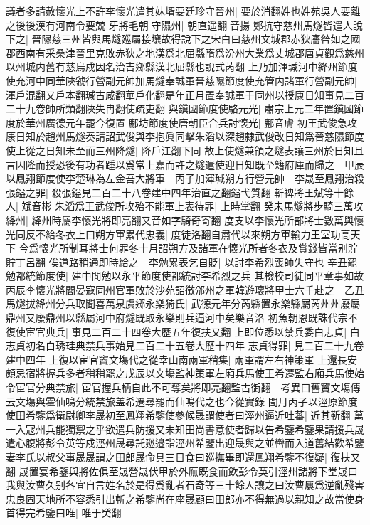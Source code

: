 議者多請赦懷光上不許李懷光遣其妹壻要廷珍守晉州|{
	要於消翻姓也姓苑吳人要離之後後漢有河南令要兢}
牙將毛朝守隰州|{
	朝直遥翻音揚}
鄭抗守慈州馬燧皆遣人說下之|{
	晉隰慈三州皆與馬燧廵屬接壤故得說下之宋白曰慈州文城郡赤狄廧咎如之國郡西南有采桑津晉里克敗赤狄之地漢爲北屈縣隋爲汾州大業爲丈城郡唐貞觀爲慈州以州城内舊冇慈烏戍因名治吉鄉縣漢北屈縣也說式芮翻}
上乃加渾瑊河中絳州節度使充河中同華陜虢行營副元帥加馬燧奉誠軍晉慈隰節度使充管内諸軍行營副元帥|{
	渾戶混翻又戶本翻瑊古咸翻華戶化翻是年正月置奉誠軍于同州以授康日知事見二百二十九卷帥所類翻陜失冉翻使疏吏翻}
與鎭國節度使駱元光|{
	肅宗上元二年置鎭國節度於華州廣德元年罷今復置}
鄜坊節度使唐朝臣合兵討懷光|{
	鄜音膚}
初王武俊急攻康日知於趙州馬燧奏請詔武俊與李抱眞同擊朱滔以深趙隸武俊改日知爲晉慈隰節度使上從之日知未至而三州降燧|{
	降戶江翻下同}
故上使燧兼領之燧表讓三州於日知且言因降而授恐後有功者踵以爲常上嘉而許之燧遣使迎日知既至籍府庫而歸之　甲辰以鳳翔節度使李楚琳為左金吾大將軍　丙子加渾瑊朔方行營元帥　李晟至鳳翔治殺張鎰之罪|{
	殺張鎰見二百二十八卷建中四年治直之翻鎰弋質翻}
斬禆將王斌等十餘人|{
	斌音彬}
朱滔爲王武俊所攻殆不能軍上表待罪|{
	上時掌翻}
癸未馬燧將步騎三萬攻絳州|{
	絳州時屬李懷光將即亮翻又音如字騎奇寄翻}
度支以李懷光所部將士數萬與懷光同反不給冬衣上曰朔方軍累代忠義|{
	度徒洛翻自肅代以來朔方軍輸力王室功高天下}
今爲懷光所制耳將士何罪冬十月詔朔方及諸軍在懷光所者冬衣及賞錢皆當别貯|{
	貯丁呂翻}
俟道路稍通即時給之　李勉累表乞自貶|{
	以討李希烈喪師失守也}
辛丑罷勉都統節度使|{
	建中閒勉以永平節度使都統討李希烈之兵}
其檢校司徒同平章事如故　丙辰李懷光將閻晏寇同州官軍敗於沙苑詔徵邠州之軍韓遊瓌將甲士六千赴之　乙丑馬燧拔絳州分兵取聞喜萬泉虞郷永樂猗氏|{
	武德元年分芮縣置永樂縣屬芮州州廢屬鼎州又廢鼎州以縣屬河中府燧既取永樂則兵逼河中矣樂音洛}
初魚朝恩既誅代宗不復使宦官典兵|{
	事見二百二十四卷大歷五年復扶又翻}
上即位悉以禁兵委白志貞|{
	白志貞初名白琇珪典禁兵事始見二百二十五卷大歷十四年}
志貞得罪|{
	見二百二十九卷建中四年}
上復以宦官竇文塲代之從幸山南兩軍稍集|{
	兩軍謂左右神策軍}
上還長安頗忌宿將握兵多者稍稍罷之戊辰以文塲監神策軍左廂兵馬使王希遷監右廂兵馬使始令宦官分典禁旅|{
	宦官握兵柄自此不可奪矣將即亮翻監古衘翻　考異曰舊竇文塲傳云文塲與霍仙鳴分統禁旅盖希遷尋罷而仙鳴代之也今從實錄}
閠月丙子以涇原節度使田希鑒爲衛尉卿李晟初至鳳翔希鑒使參候晟謂使者曰涇州逼近吐蕃|{
	近其靳翻}
萬一入寇州兵能獨禦之乎欲遣兵防援又未知田尚書意使者歸以告希鑒希鑒果請援兵晟遣心腹將彭令英等戍涇州晟尋託廵邉詣涇州希鑒出迎晟與之並轡而入道舊結歡希鑒妻李氏以叔父事晟晟謂之田郎晟命具三日食曰廵撫畢即還鳳翔希鑒不復疑|{
	復扶又翻}
晟置宴希鑒與將佐俱至晟營晟伏甲於外廡既食而飲彭令英引涇州諸將下堂晟曰我與汝曹久别各宜自言姓名於是得爲亂者石奇等三十餘人讓之曰汝曹屢爲逆亂殘害忠良固天地所不容悉引出斬之希鑒尚在座晟顧曰田郎亦不得無過以親知之故當使身首得完希鑒曰唯|{
	唯于癸翻}
